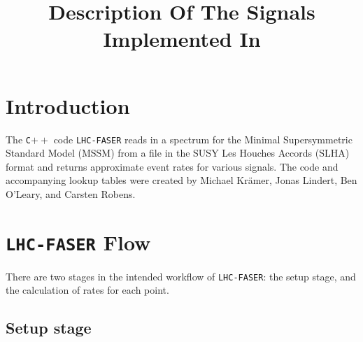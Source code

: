 \documentclass[10pt]{article}
\title{Description Of The Signals Implemented In \faser}
\newcommand{\faser}[0]{\texttt{LHC-FASER}\xspace}
\newcommand{\cpp}[0]{\texttt{C$++$}\xspace}
\begin{document}
\maketitle
\tableofcontents
\section{Introduction}
\label{sec:intro}

The \cpp code \faser reads in a spectrum for the Minimal Supersymmetric Standard
 Model (MSSM) from a file in the SUSY Les Houches Accords (SLHA) format and
 returns approximate event rates for various signals. The code and accompanying
 lookup tables were created by Michael Kr{\"{a}}mer, Jonas Lindert, Ben O'Leary,
 and Carsten Robens.

\section{\faser Flow}
\label{sec:flow}

There are two stages in the intended workflow of \faser: the setup stage, and
 the calculation of rates for each point.

\subsection{Setup stage}
\label{subsec:setupflow}
\end{document}

